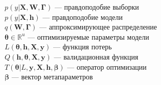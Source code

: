 $p(y|\mathbf{X}, \mathbf{W}, \boldsymbol{\Gamma})$ --- правдоподобие выборки\\
$p(y|\mathbf{X}, \mathbf{h})$ --- правдоподобие модели\\
$q(\mathbf{W}, \boldsymbol{\Gamma})$ --- аппроксимирующее распределение\\
$\boldsymbol{\theta} \in \mathbb{R}^u$ --- оптимизируемые параметры модели\\
$L(\boldsymbol{\theta}, \mathbf{h}, \mathbf{X}, \mathbf{y})$ --- функция потерь\\
$Q(\mathbf{h}, \boldsymbol{\theta},  \mathbf{X}, \mathbf{y})$ --- валидационная функция\\
$T(\boldsymbol{\theta}| L, \mathbf{y}, \mathbf{X},  \mathbf{h}, \boldsymbol{\beta})$ --- оператор оптимизации\\
$\boldsymbol{\beta}$ --- вектор метапараметров\\
